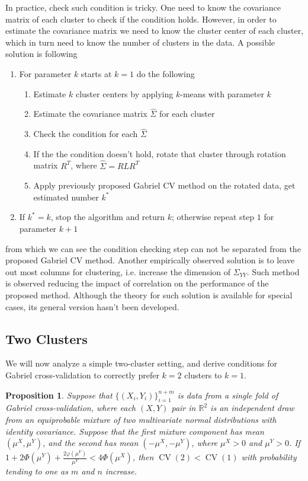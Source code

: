 \documentclass[12pt]{article}
\newtheorem{proposition}{Proposition}
\newcommand{\CV}{\operatorname{CV}}
\newcommand{\R}{\mathbb{R}}
\newcommand{\muX}{\mu^{X}}
\newcommand{\muY}{\mu^{Y}}
\begin{document}
In practice, check such condition is tricky. One need to know the covariance matrix of each cluster to check if the condition holds. However, in order to estimate the covariance matrix we need to know the cluster center of each cluster, which in turn need to know the number of clusters in the data. A possible solution is following
\begin{enumerate}
	\item For parameter $k$ starts at $k=1$ do the following
	\begin{enumerate}[label=(\roman*)]
		\item Estimate $k$ cluster centers by applying $k$-means with parameter $k$
		\item Estimate the covariance matrix $\hat{\Sigma}$ for each cluster 
		\item Check the condition for each $\hat{\Sigma}$
		\item If the the condition doesn't hold, rotate that cluster through 
		rotation matrix $R^T$, where $\hat{\Sigma} = RLR^T$ 
		\item Apply previously proposed Gabriel CV method on the rotated data, get estimated number $k^*$
	\end{enumerate}
	\item If $k^* = k$, stop the algorithm and return $k$; otherwise repeat step $1$ for parameter $k+1$
\end{enumerate}
from which we can see the condition checking step can not be separated from the proposed Gabriel CV method.
Another empirically observed solution is to leave out most columns for clustering, i.e. increase the 
dimension of $\Sigma_{YY}$. Such method is observed reducing the impact of correlation on the performance 
of the proposed method. Although the theory for such solution is available for special cases,
its general version hasn't been developed.    

\subsection{Two Clusters}

We will now analyze a simple two-cluster setting, and derive conditions for
Gabriel cross-validation to correctly prefer $k=2$ clusters to $k=1$.

\begin{proposition}
Suppose that $\{(X_i,Y_i)\}_{i=1}^{n+m}$ is data from a single fold of Gabriel
cross-validation, where each $(X,Y)$ pair in $\R^2$ is an independent draw
from an equiprobable mixture of two multivariate normal distributions with
identity covariance. Suppose that the first mixture component has mean $(\muX,
\muY)$, and the second has mean $(-\muX, -\muY)$, where $\muX > 0$ and
$\muY > 0$.  If $1 + 2\Phi(\mu^Y)+ \frac{2\varphi(\mu^Y)}{\mu^Y} < 4\Phi(\mu^X)$, then $\CV(2) < \CV(1)$ with
probability tending to one as $m$ and $n$ increase.
\end{proposition}
\end{document}
